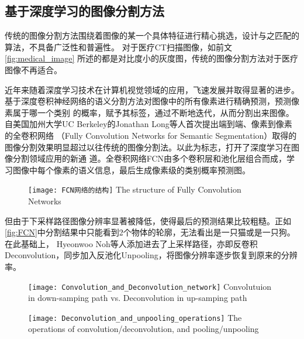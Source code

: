 	\subsection{基于深度学习的图像分割方法}
	
	传统的图像分割方法围绕着图像的某一个具体特征进行精心挑选，设计与之匹配的算法，不具备广泛性和普遍性。 对于医疗CT扫描图像，如前文\autoref{fig:medical_image}
	所述的都是对比度小的灰度图，传统的图像分割方法对于医疗图像不再适合。
	
	近年来随着深度学习技术在计算机视觉领域的应用，飞速发展并取得显著的进步。 基于深度卷积神经网络的语义分割方法对图像中的所有像素进行精确预测，预测像素属于哪一个类别
	的概率，赋予其标签，通过不断地迭代，从而分割出来图像。自美国加州大学UC Berkeley的Jonathan Long等人\cite{long2015fully}首次提出端到端、像素到像素的全卷积网络
	（Fully Convolution Networks for Semantic Segmentation）取得的图像分割效果明显超过以往传统的图像分割法。以此为标志，打开了深度学习在图像分割领域应用的新通
	道。全卷积网络FCN由多个卷积层和池化层组合而成，学习图像中每个像素的语义信息，最后生成像素级的类别概率预测图。
	\begin{figure}[!htp]
		\centering
		\texttt{[image: FCN网络的结构]}
			{The structure of Fully Convolution Networks}
		\label{fig:FCN}
	\end{figure}
	
	但由于下采样路径图像分辨率显著被降低，使得最后的预测结果比较粗糙。正如\autoref{fig:FCN}中分割结果中只能看到2个物体的轮廓，无法看出是一只猫或是一只狗。在此基础上，
	Hyeonwoo Noh等人\cite{Noh2015LearningDN}添加进去了上采样路径，亦即反卷积Deconvolution，同步加入反池化Unpooling，将图像分辨率逐步恢复到原来的分辨率。
	\begin{figure}[!htp]
		\centering
		\texttt{[image: Convolution\_and\_Deconvolution\_network]}
			{Convolutuion in down-samping path vs. Deconvolution in up-samping path}
		\label{fig:conv_deconv}
	\end{figure}
	\begin{figure}[!htp]
		\centering
		\texttt{[image: Deconvolution\_and\_unpooling\_operations]}
			{The operations of convolution/deconvolution, and pooling/unpooling}
		\label{fig:conv_deconv_pooling_unpooling}
	\end{figure}
	

